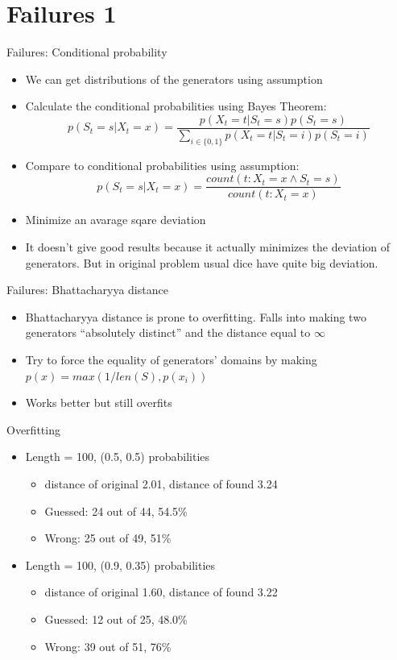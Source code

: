 \documentclass[hyperref=unicode,graphics=pdflatex,13pt]{beamer}
\begin{document}
\section{Failures 1}
\begin{frame}{Failures: Conditional probability}
 \begin{itemize}
  \item We can get distributions of the generators using assumption
  \item Calculate the conditional probabilities using Bayes Theorem:
  $$p(S_t = s | X_t = x) = \frac{p(X_t = t | S_t = s) p(S_t = s)}{\sum_{i \in \{0, 1\}}p(X_t = t | S_t = i) p(S_t = i)}$$
  \item Compare to conditional probabilities using assumption:
  $$p(S_t = s | X_t = x) = \frac{count(t: X_t = x \wedge S_t = s)}{count(t: X_t = x)}$$
  \item Minimize an avarage sqare deviation
  \item It doesn't give good results because it actually minimizes the deviation of generators. But in original problem usual dice have quite big deviation.
 \end{itemize}

\end{frame}

\begin{frame}{Failures: Bhattacharyya distance}
\begin{itemize}
 \item Bhattacharyya distance is prone to overfitting. Falls into making two generators ``absolutely distinct'' and the distance equal to $\infty$
 \item Try to force the equality of generators' domains by making $p(x) = max(1/len(S), p(x_i))$
 \item Works better but still overfits
\end{itemize}
\end{frame}

\begin{frame}{Overfitting}
  \begin{itemize}
   \item Length = 100, (0.5, 0.5) probabilities
   \begin{itemize}
   \item distance of original 2.01, distance of found 3.24
   \item Guessed: 24 out of 44, 54.5\%
   \item Wrong: 25 out of 49, 51\%
   \end{itemize}
  \item Length = 100, (0.9, 0.35) probabilities
  \begin{itemize}
   \item distance of original 1.60, distance of found 3.22
   \item Guessed: 12 out of 25, 48.0\%
   \item Wrong: 39 out of 51, 76\%
  \end{itemize}
  \end{itemize}
\end{frame}
\end{document}
